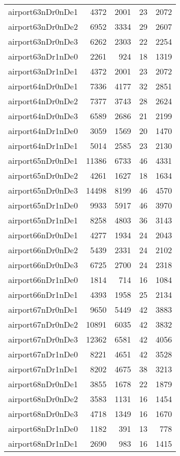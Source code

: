 \begin{longtable}{lrrrr}
airport63nDr0nDe1 & 4372 & 2001 & 23 & 2072 \\
airport63nDr0nDe2 & 6952 & 3334 & 29 & 2607 \\
airport63nDr0nDe3 & 6262 & 2303 & 22 & 2254 \\
airport63nDr1nDe0 & 2261 & 924 & 18 & 1319 \\
airport63nDr1nDe1 & 4372 & 2001 & 23 & 2072 \\
airport64nDr0nDe1 & 7336 & 4177 & 32 & 2851 \\
airport64nDr0nDe2 & 7377 & 3743 & 28 & 2624 \\
airport64nDr0nDe3 & 6589 & 2686 & 21 & 2199 \\
airport64nDr1nDe0 & 3059 & 1569 & 20 & 1470 \\
airport64nDr1nDe1 & 5014 & 2585 & 23 & 2130 \\
airport65nDr0nDe1 & 11386 & 6733 & 46 & 4331 \\
airport65nDr0nDe2 & 4261 & 1627 & 18 & 1634 \\
airport65nDr0nDe3 & 14498 & 8199 & 46 & 4570 \\
airport65nDr1nDe0 & 9933 & 5917 & 46 & 3970 \\
airport65nDr1nDe1 & 8258 & 4803 & 36 & 3143 \\
airport66nDr0nDe1 & 4277 & 1934 & 24 & 2043 \\
airport66nDr0nDe2 & 5439 & 2331 & 24 & 2102 \\
airport66nDr0nDe3 & 6725 & 2700 & 24 & 2318 \\
airport66nDr1nDe0 & 1814 & 714 & 16 & 1084 \\
airport66nDr1nDe1 & 4393 & 1958 & 25 & 2134 \\
airport67nDr0nDe1 & 9650 & 5449 & 42 & 3883 \\
airport67nDr0nDe2 & 10891 & 6035 & 42 & 3832 \\
airport67nDr0nDe3 & 12362 & 6581 & 42 & 4056 \\
airport67nDr1nDe0 & 8221 & 4651 & 42 & 3528 \\
airport67nDr1nDe1 & 8202 & 4675 & 38 & 3213 \\
airport68nDr0nDe1 & 3855 & 1678 & 22 & 1879 \\
airport68nDr0nDe2 & 3583 & 1131 & 16 & 1454 \\
airport68nDr0nDe3 & 4718 & 1349 & 16 & 1670 \\
airport68nDr1nDe0 & 1182 & 391 & 13 & 778 \\
airport68nDr1nDe1 & 2690 & 983 & 16 & 1415 \\

\end{longtable}
